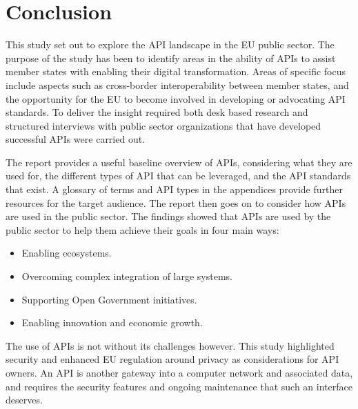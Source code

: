 \chapter{Conclusion}

\ifpdf
\graphicspath{{Conclusion/Figs/Raster/}{Conclusion/Figs/PDF/}{Conclusion/Figs/}}
\else
\graphicspath{{Conclusion/Figs/Vector/}{Conclusion/Figs/}}
\fi

This study set out to explore the API landscape in the EU public sector. The
purpose of the study has been to identify areas in the ability of APIs to assist
member states with enabling their digital transformation. Areas of specific focus
include aspects such as cross-border interoperability between member states, and
the opportunity for the EU to become involved in developing or advocating API
standards. To deliver the insight required both desk based research and structured
interviews with public sector organizations that have developed successful APIs 
were carried out.

The report provides a useful baseline overview of APIs, considering what they are
used for, the different types of API that can be leveraged, and the API standards
that exist. A glossary of terms and API types in the appendices provide further
resources for the target audience. The report then goes on to consider how APIs
are used in the public sector. The findings showed that APIs are used by the public
sector to help them achieve their goals in four main ways:
\begin{itemize}
	\item Enabling ecosystems.
	\item Overcoming complex integration of large systems.
	\item Supporting Open Government initiatives.
	\item Enabling innovation and economic growth.
\end{itemize}

The use of APIs is not without its challenges however. This study highlighted security
and enhanced EU regulation around privacy as considerations for API owners. An API
is another gateway into a computer network and associated data, and requires the security features and ongoing maintenance that such an interface deserves.

